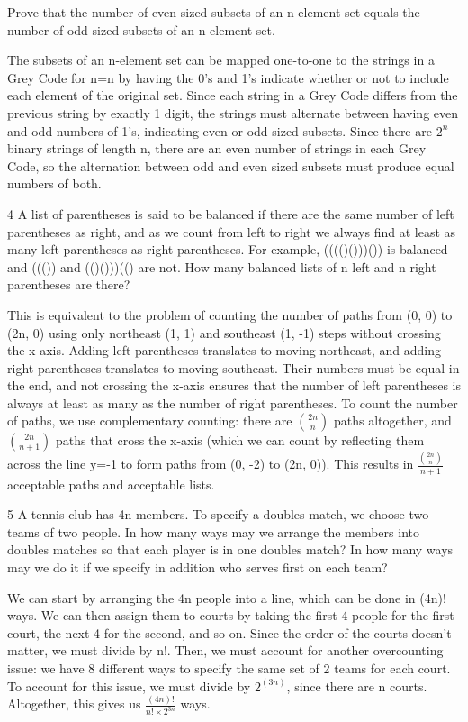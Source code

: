 
\begin{problem}{3.3}{Prove that the number of even-sized subsets of an n-element set equals the number of odd-sized subsets of an n-element set.}
\end{problem}
    The subsets of an n-element set can be mapped one-to-one to the strings in a Grey Code for n=n by having the 0's and 1's indicate whether or not to include each element of the original set. Since each string in a Grey Code differs from the previous string by exactly 1 digit, the strings must alternate between having even and odd numbers of 1's, indicating even or odd sized subsets. Since there are $2^n$ binary strings of length n, there are an even number of strings in each Grey Code, so the alternation between odd and even sized subsets must produce equal numbers of both. 


\begin{problem} 4 {A list of parentheses is said to be balanced if there are the same number of left parentheses as right, and as we count from left to right we always find at least as many left parentheses as right parentheses. For example, (((()()))()) is balanced and ((()) and (()()))(() are not. How many balanced lists of n left and n right parentheses are there?}
\end{problem}
    This is equivalent to the problem of counting the number of paths from (0, 0) to (2n, 0) using only northeast (1, 1) and southeast (1, -1) steps without crossing the x-axis. Adding left parentheses translates to moving northeast, and adding right parentheses translates to moving southeast. Their numbers must be equal in the end, and not crossing the x-axis ensures that the number of left parentheses is always at least as many as the number of right parentheses. To count the number of paths, we use complementary counting: there are $\binom{2n}n$ paths altogether, and $\binom{2n}{n+1}$ paths that cross the x-axis (which we can count by reflecting them across the line y=-1 to form paths from (0, -2) to (2n, 0)). This results in \(\frac{\binom{2n}{n}}{n+1}\) acceptable paths and acceptable lists. 


\begin{problem} 5 {A tennis club has 4n members. To specify a doubles match, we choose two teams of two people. In how many ways may we arrange the members into doubles matches so that each player is in one doubles match? In how many ways may we do it if we specify in addition who serves first on each team?}
\end{problem}
    We can start by arranging the 4n people into a line, which can be done in (4n)! ways. We can then assign them to courts by taking the first 4 people for the first court, the next 4 for the second, and so on. Since the order of the courts doesn't matter, we must divide by n!. Then, we must account for another overcounting issue: we have 8 different ways to specify the same set of 2 teams for each court. To account for this issue, we must divide by $2^{(3n)}$, since there are n courts. Altogether, this gives us \(\frac{(4n)!}{n! \times 2^{3n}}\) ways.

